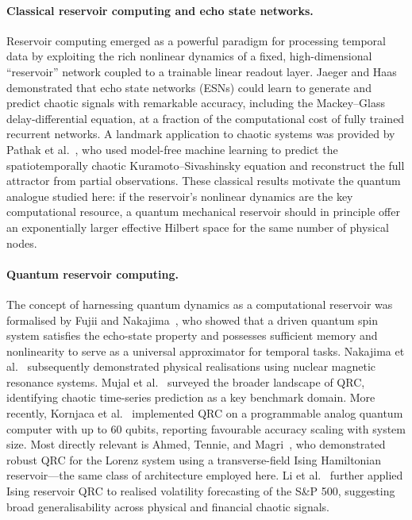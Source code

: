 \documentclass[11pt,a4paper]{article}
\begin{document}
\paragraph{Classical reservoir computing and echo state networks.}
Reservoir computing emerged as a powerful paradigm for processing temporal data
by exploiting the rich nonlinear dynamics of a fixed, high-dimensional
``reservoir'' network coupled to a trainable linear readout layer.
Jaeger and Haas~\cite{jaeger2004harnessing} demonstrated that echo state
networks (ESNs) could learn to generate and predict chaotic signals with
remarkable accuracy, including the Mackey--Glass delay-differential equation,
at a fraction of the computational cost of fully trained recurrent networks.
A landmark application to chaotic systems was provided by Pathak
et al.~\cite{pathak2018model}, who used model-free machine learning to predict
the spatiotemporally chaotic Kuramoto--Sivashinsky equation and reconstruct
the full attractor from partial observations.
These classical results motivate the quantum analogue studied here: if the
reservoir's nonlinear dynamics are the key computational resource, a quantum
mechanical reservoir should in principle offer an exponentially larger effective
Hilbert space for the same number of physical nodes.

\paragraph{Quantum reservoir computing.}
The concept of harnessing quantum dynamics as a computational reservoir was
formalised by Fujii and Nakajima~\cite{fujii2017}, who showed that a driven
quantum spin system satisfies the echo-state property and possesses sufficient
memory and nonlinearity to serve as a universal approximator for temporal tasks.
Nakajima et al.~\cite{nakajima2019boosting} subsequently demonstrated physical
realisations using nuclear magnetic resonance systems.
Mujal et al.~\cite{mujal2021} surveyed the broader landscape of QRC,
identifying chaotic time-series prediction as a key benchmark domain.
More recently, Kornjaca et al.~\cite{kornjaca2024largescale} implemented QRC on
a programmable analog quantum computer with up to $60$ qubits, reporting
favourable accuracy scaling with system size.
Most directly relevant is Ahmed, Tennie, and Magri~\cite{ahmed2025robust}, who
demonstrated robust QRC for the Lorenz system using a transverse-field Ising
Hamiltonian reservoir---the same class of architecture employed here.
Li et al.~\cite{li2025qrc} further applied Ising reservoir QRC to realised
volatility forecasting of the S\&P 500, suggesting broad generalisability across
physical and financial chaotic signals.
\end{document}

